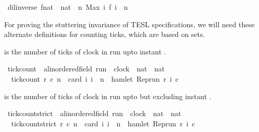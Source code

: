 \begin{isabellebody}
\ {\isacartoucheopen}dil{\isacharunderscore}inverse\ f{\isacharcolon}{\isacharcolon}{\isacharparenleft}nat\ {\isasymRightarrow}\ nat{\isacharparenright}\ {\isasymequiv}\ {\isacharparenleft}{\isasymlambda}n{\isachardot}\ Max\ {\isacharbraceleft}i{\isachardot}\ f\ i\ {\isasymle}\ n{\isacharbraceright}{\isacharparenright}{\isacartoucheclose}%
\isadelimdocument
%
\endisadelimdocument
%
\isatagdocument
%
\isamarkuptrue%
%
\endisatagdocument
{\isafolddocument}%
%
\isadelimdocument
%
\endisadelimdocument
%
\begin{isamarkuptext}%
For proving the stuttering invariance of TESL specifications, we will need
  these alternate definitions for counting ticks, which are based on sets.%
\end{isamarkuptext}\isamarkuptrue%
%
\begin{isamarkuptext}%
 is the number of ticks of clock  in 
  run  upto instant .%
\end{isamarkuptext}\isamarkuptrue%
\isamarkupfalse%
\ tick{\isacharunderscore}count\ {\isacharcolon}{\isacharcolon}\ {\isacartoucheopen}{\isacharprime}a{\isacharcolon}{\isacharcolon}linordered{\isacharunderscore}field\ run\ {\isasymRightarrow}\ clock\ {\isasymRightarrow}\ nat\ {\isasymRightarrow}\ nat{\isacartoucheclose}\isanewline
{}\isanewline
\ \ {\isacartoucheopen}tick{\isacharunderscore}count\ r\ c\ n\ {\isacharequal}\ card\ {\isacharbraceleft}i{\isachardot}\ i\ {\isasymle}\ n\ {\isasymand}\ hamlet\ {\isacharparenleft}{\isacharparenleft}Rep{\isacharunderscore}run\ r{\isacharparenright}\ i\ c{\isacharparenright}{\isacharbraceright}{\isacartoucheclose}%
\begin{isamarkuptext}%
 is the number of ticks of clock  
  in run  upto but excluding instant .%
\end{isamarkuptext}\isamarkuptrue%
\isamarkupfalse%
\ tick{\isacharunderscore}count{\isacharunderscore}strict\ {\isacharcolon}{\isacharcolon}\ {\isacartoucheopen}{\isacharprime}a{\isacharcolon}{\isacharcolon}linordered{\isacharunderscore}field\ run\ {\isasymRightarrow}\ clock\ {\isasymRightarrow}\ nat\ {\isasymRightarrow}\ nat{\isacartoucheclose}\isanewline
{}\isanewline
\ \ {\isacartoucheopen}tick{\isacharunderscore}count{\isacharunderscore}strict\ r\ c\ n\ {\isacharequal}\ card\ {\isacharbraceleft}i{\isachardot}\ i\ {\isacharless}\ n\ {\isasymand}\ hamlet\ {\isacharparenleft}{\isacharparenleft}Rep{\isacharunderscore}run\ r{\isacharparenright}\ i\ c{\isacharparenright}{\isacharbraceright}{\isacartoucheclose}\isanewline
\isanewline
%
\isadelimtheory
\isanewline
%
\endisadelimtheory
%
\isatagtheory
{}\isamarkupfalse%
%
\endisatagtheory
{\isafoldtheory}%
%
\isadelimtheory
%
\endisadelimtheory
%
\end{isabellebody}%
